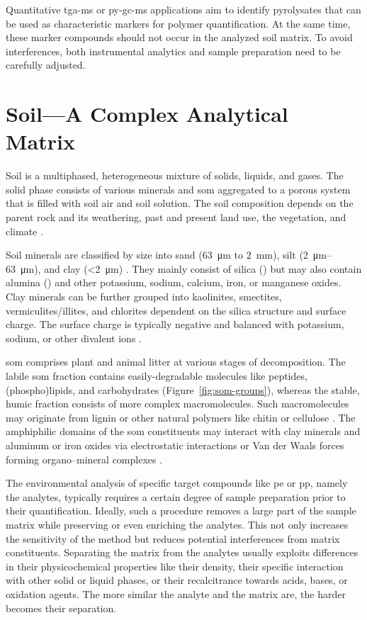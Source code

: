 Quantitative \ac{tga-ms} or \ac{py-gc-ms} applications aim to identify pyrolysates that can be used as characteristic markers for polymer quantification. At the same time, these marker compounds should not occur in the analyzed soil matrix. To avoid interferences, both instrumental analytics and sample preparation need to be carefully adjusted.

\section{Soil---A Complex Analytical Matrix}
\label{sec:intro:soil-matrix}

Soil is a multiphased, heterogeneous mixture of solids, liquids, and gases. The solid phase consists of various minerals and \ac{som} aggregated to a porous system that is filled with soil air and soil solution. The soil composition depends on the parent rock and its weathering, past and present land use, the vegetation, and climate \citep{BrummerIntroduction2016}. 

Soil minerals are classified by size into sand (\SI{63}{\micro\meter} to \SI{2}{\milli\meter}), silt (\SIrange{2}{63}{\micro\meter}), and clay (\SI{<2}{\micro\meter}) \citep{SponagelBodenkundliche2005}. They mainly consist of silica () but may also contain alumina () and other potassium, sodium, calcium, iron, or manganese oxides. Clay minerals can be further grouped into kaolinites, smectites, vermiculites\slash illites, and chlorites dependent on the silica structure and surface charge. The surface charge is typically negative and balanced with potassium, sodium, or other divalent ions \citep{StahrInorganic2016}.

\Ac{som} comprises plant and animal litter at various stages of decomposition. The labile \ac{som} fraction
contains easily-degradable molecules like peptides, (phospho)lipids, and carbohydrates (Figure~\ref{fig:som-groups}), whereas the stable, humic fraction consists of more complex macromolecules. Such macromolecules may originate from lignin or other natural polymers like chitin or cellulose \citep{Kogel-KnabnerSoil2016}.
The amphiphilic domains of the \ac{som} constituents may interact with clay minerals and aluminum or iron oxides via electrostatic interactions or Van der Waals forces forming organo--mineral complexes \citep{KleberConceptual2007}.

The environmental analysis of specific target compounds like \ac{pe} or \ac{pp}, namely the analytes, typically requires a certain degree of sample preparation prior to their quantification. Ideally, such a procedure removes a large part of the sample matrix while preserving or even enriching the analytes. This not only increases the sensitivity of the method but reduces potential interferences from matrix constituents. Separating the matrix from the analytes usually exploits differences in their physicochemical properties like their density, their specific interaction with other solid or liquid phases, or their recalcitrance towards acids, bases, or oxidation agents. The more similar the analyte and the matrix are, the harder becomes their separation.

